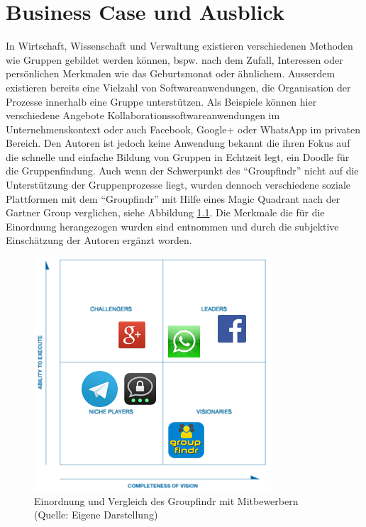 \chapter{Business Case und Ausblick}
\label{business_case}

In Wirtschaft, Wissenschaft und Verwaltung existieren verschiedenen Methoden wie Gruppen gebildet werden können, bspw. nach dem Zufall, Interessen oder persönlichen Merkmalen wie das Geburtsmonat oder ähnlichem. Ausserdem existieren bereits eine Vielzahl von Softwareanwendungen, die Organisation der Prozesse innerhalb eine Gruppe unterstützen. Als Beispiele können hier verschiedene Angebote Kollaborationssoftwareanwendungen im Unternehmenskontext oder auch Facebook, Google+ oder WhatsApp im privaten Bereich. Den Autoren ist jedoch keine Anwendung bekannt die ihren Fokus auf die schnelle und einfache Bildung von Gruppen in Echtzeit legt, ein Doodle für die Gruppenfindung. 
\newline\newline
Auch wenn der Schwerpunkt des "`Groupfindr"' nicht auf die Unterstützung der Gruppenprozesse liegt, wurden dennoch verschiedene soziale Plattformen mit dem "`Groupfindr"' mit Hilfe eines Magic Quadrant nach der Gartner Group \citet{magic_quadrant} verglichen, siehe Abbildung \ref{magic_quadrant}.  Die Merkmale die für die Einordnung herangezogen wurden sind \citet{gruppen-bildung} entnommen und durch die subjektive Einschätzung der Autoren ergänzt worden.

\begin{figure}[h]
\centering
\includegraphics{graphiken/magic_quadrant.png}%
\caption{Einordnung und Vergleich des Groupfindr mit Mitbewerbern (Quelle: Eigene Darstellung)}%
\label{magic_quadrant}%
\end{figure}

